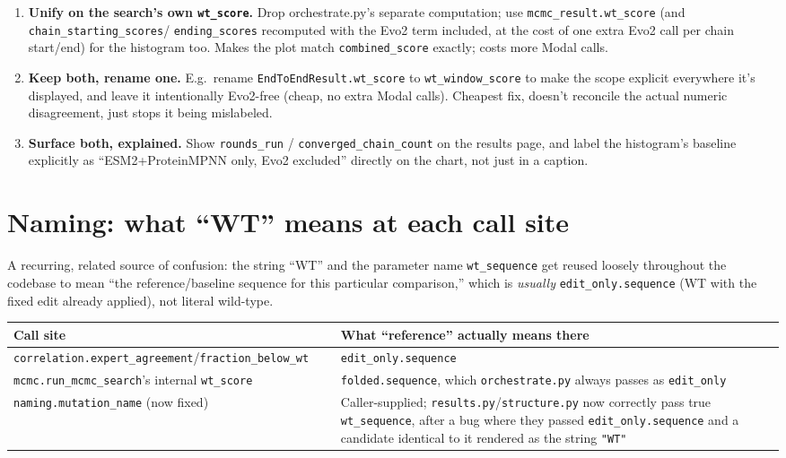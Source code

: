 \documentclass[11pt]{article}
\begin{document}
\begin{enumerate}
  \item \textbf{Unify on the search's own \texttt{wt\_score}.} Drop
    orchestrate.py's separate computation; use
    \texttt{mcmc\_result.wt\_score} (and \texttt{chain\_starting\_scores}/
    \texttt{ending\_scores} recomputed with the Evo2 term included, at the
    cost of one extra Evo2 call per chain start/end) for the histogram too.
    Makes the plot match \texttt{combined\_score} exactly; costs more Modal
    calls.
  \item \textbf{Keep both, rename one.} E.g.\ rename
    \texttt{EndToEndResult.wt\_score} to \texttt{wt\_window\_score} to make
    the scope explicit everywhere it's displayed, and leave it
    intentionally Evo2-free (cheap, no extra Modal calls). Cheapest fix,
    doesn't reconcile the actual numeric disagreement, just stops it being
    mislabeled.
  \item \textbf{Surface both, explained.} Show \texttt{rounds\_run} /
    \texttt{converged\_chain\_count} on the results page, and label the
    histogram's baseline explicitly as ``ESM2+ProteinMPNN only, Evo2
    excluded'' directly on the chart, not just in a caption.
\end{enumerate}

\section{Naming: what ``WT'' means at each call site}
\label{sec:naming}

A recurring, related source of confusion: the string ``WT'' and the
parameter name \texttt{wt\_sequence} get reused loosely throughout the
codebase to mean ``the reference/baseline sequence for this particular
comparison,'' which is \emph{usually} \texttt{edit\_only.sequence} (WT with
the fixed edit already applied), not literal wild-type.

\begin{center}
\begin{tabular}{@{}p{0.42\linewidth}p{0.58\linewidth}@{}}
\toprule
Call site & What ``reference'' actually means there \\
\midrule
\texttt{correlation.expert\_agreement}/\texttt{fraction\_below\_wt} & \texttt{edit\_only.sequence} \\
\texttt{mcmc.run\_mcmc\_search}'s internal \texttt{wt\_score} & \texttt{folded.sequence}, which \texttt{orchestrate.py} always passes as \texttt{edit\_only} \\
\texttt{naming.mutation\_name} (now fixed) & Caller-supplied; \texttt{results.py}/\texttt{structure.py} now correctly pass true \texttt{wt\_sequence}, after a bug where they passed \texttt{edit\_only.sequence} and a candidate identical to it rendered as the string \texttt{"WT"} \\
\bottomrule
\end{tabular}
\end{center}
\end{document}
